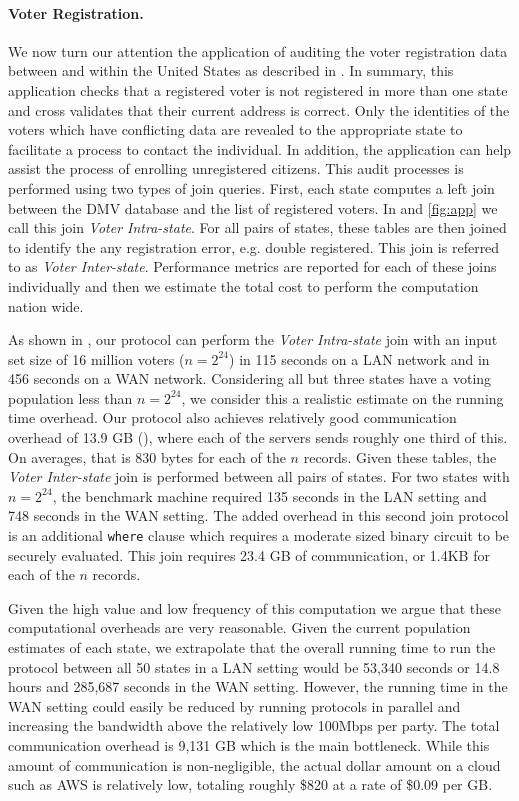 \paragraph{Voter Registration. } We now turn our attention the application of auditing the voter registration data between and within the United States as described in . In summary, this application checks that a registered voter is not registered in more than one state and cross validates that their current address is correct. Only the identities of the voters which have conflicting data are revealed to the appropriate state to facilitate a process to contact the individual. In addition, the application can help assist the process of enrolling unregistered citizens. This audit processes is performed using two types of join queries. First, each state computes a left join between the DMV database and the list of registered voters. In  and \ref{fig:app} we call this join \emph{Voter Intra-state}. For all pairs of states, these tables are then joined to identify the any registration error, e.g. double registered. This join is referred to as \emph{Voter Inter-state}. Performance metrics are reported for each of these joins individually and then we estimate the total cost to perform the computation nation wide. 

As shown in , our  protocol can perform the \emph{Voter Intra-state} join with an input set size of 16 million voters ($n=2^{24}$) in 115 seconds on a LAN network and in 456 seconds on a WAN network. Considering all but three states have a voting population less than $n=2^{24}$, we consider this a realistic estimate on the running time overhead. Our protocol also achieves relatively good communication overhead of 13.9 GB (), where each of the servers sends roughly one third of this. On averages, that is 830 bytes for each of the $n$ records. Given these tables, the \emph{Voter Inter-state} join is performed between all pairs of states. For two states with $n=2^{24}$, the benchmark machine required 135 seconds in the LAN setting and 748 seconds in the WAN setting. The added overhead in this second join protocol is an additional \texttt{where} clause which requires a moderate sized binary circuit to be securely evaluated. This join requires 23.4 GB of communication, or 1.4KB for each of the $n$ records.

Given the high value and low frequency of this computation we argue that these computational overheads are very reasonable. Given the current population estimates of each state, we extrapolate that the overall running time to run the protocol between all 50 states in a LAN setting would be 53,340 seconds or 14.8 hours and  285,687 seconds in the WAN setting. However, the running time in the WAN setting could easily be reduced by running protocols in parallel and increasing the bandwidth above the relatively low 100Mbps per party. The total communication overhead is 9,131 GB which is the main bottleneck.  While this amount of communication is non-negligible, the actual dollar amount on a cloud such as AWS\cite{aws} is relatively low, totaling roughly \$820 at a rate of \$0.09 per GB\cite{aws_pricing}. 


